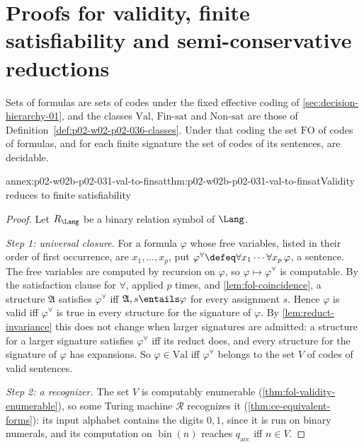 \section{Proofs for validity, finite satisfiability and semi-conservative reductions}
\label{sec:annex-p02-w02b-p02-031-validity-finsat}

Sets of formulas are sets of codes under the fixed effective coding of
\cref{sec:decision-hierarchy-01}, and the classes \(\mathrm{Val}\),
\(\mathrm{Fin\text{-}sat}\) and \(\mathrm{Non\text{-}sat}\) are those of
Definition~\ref{def:p02-w02-p02-036-classes}.  Under that coding the set
\(\mathrm{FO}\) of codes of formulas, and for each finite signature the set of
codes of its sentences, are decidable.

\begin{annexitem}{annex:p02-w02b-p02-031-val-to-finsat}{thm:p02-w02b-p02-031-val-to-finsat}{Validity reduces to finite satisfiability}
\begin{proof}
Let \(R_{\Lang}\) be a binary relation symbol of \(\Lang\).

\emph{Step 1: universal closure.}  For a formula \(\varphi\) whose free
variables, listed in their order of first occurrence, are
\(x_1,\ldots,x_p\), put \(\varphi^{\forall}\defeq\forall x_1\cdots\forall
x_p\,\varphi\), a sentence.  The free variables are computed by recursion on
\(\varphi\), so \(\varphi\mapsto\varphi^{\forall}\) is computable.  By the
satisfaction clause for \(\forall\), applied \(p\) times, and
\cref{lem:fol-coincidence}, a structure \(\mathfrak A\) satisfies
\(\varphi^{\forall}\) iff \(\mathfrak A,s\entails\varphi\) for every
assignment \(s\).  Hence \(\varphi\) is valid iff \(\varphi^{\forall}\) is
true in every structure for the signature of \(\varphi\).  By
\cref{lem:reduct-invariance} this does not change when larger signatures are
admitted: a structure for a larger signature satisfies \(\varphi^{\forall}\)
iff its reduct does, and every structure for the signature of \(\varphi\) has
expansions.  So \(\varphi\in\mathrm{Val}\) iff \(\varphi^{\forall}\) belongs
to the set \(V\) of codes of valid sentences.

\emph{Step 2: a recognizer.}  The set \(V\) is computably enumerable
(\cref{thm:fol-validity-enumerable}), so some Turing machine \(\mathcal R\)
recognizes it (\cref{thm:ce-equivalent-forms}): its input alphabet contains
the digits \(0,1\), since it is run on binary numerals, and its computation
on \(\operatorname{bin}(n)\) reaches \(q_{\mathrm{acc}}\) iff \(n\in V\).


\end{proof}
\end{annexitem}
